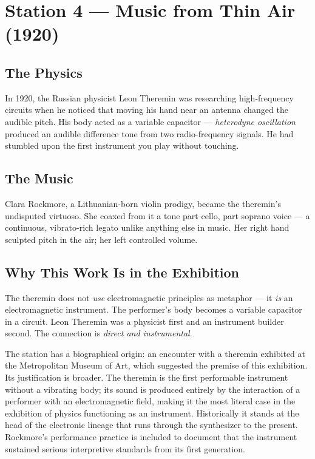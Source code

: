 \documentclass[11pt]{article}
\begin{document}
\section{Station 4 --- Music from Thin Air (1920)}

\subsection{The Physics}
In 1920, the Russian physicist Leon Theremin was researching high-frequency circuits when he
noticed that moving his hand near an antenna changed the audible pitch. His body acted as a
variable capacitor --- \emph{heterodyne oscillation} produced an audible difference tone from
two radio-frequency signals. He had stumbled upon the first instrument you play without
touching.

\subsection{The Music}
Clara Rockmore, a Lithuanian-born violin prodigy, became the theremin's undisputed virtuoso.
She coaxed from it a tone part cello, part soprano voice --- a continuous, vibrato-rich
legato unlike anything else in music. Her right hand sculpted pitch in the air; her left
controlled volume.

\subsection{Why This Work Is in the Exhibition}
The theremin does not \emph{use} electromagnetic principles as metaphor --- it \emph{is} an
electromagnetic instrument. The performer's body becomes a variable capacitor in a circuit.
Leon Theremin was a physicist first and an instrument builder second. The connection is
\emph{direct and instrumental}.

The station has a biographical origin: an encounter with a theremin exhibited at the
Metropolitan Museum of Art, which suggested the premise of this exhibition. Its justification
is broader. The theremin is the first performable instrument without a vibrating body; its
sound is produced entirely by the interaction of a performer with an electromagnetic field,
making it the most literal case in the exhibition of physics functioning as an instrument.
Historically it stands at the head of the electronic lineage that runs through the
synthesizer to the present. Rockmore's performance practice is included to document that the
instrument sustained serious interpretive standards from its first generation.
\end{document}

